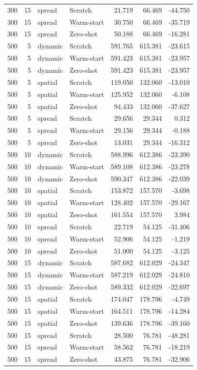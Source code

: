 \begin{tabular}{rrllrrr}
300 & 15 & spread & Scratch & 21.719 & 66.469 & -44.750 \\
300 & 15 & spread & Warm-start & 30.750 & 66.469 & -35.719 \\
300 & 15 & spread & Zero-shot & 50.188 & 66.469 & -16.281 \\
500 & 5 & dynamic & Scratch & 591.765 & 615.381 & -23.615 \\
500 & 5 & dynamic & Warm-start & 591.423 & 615.381 & -23.957 \\
500 & 5 & dynamic & Zero-shot & 591.423 & 615.381 & -23.957 \\
500 & 5 & spatial & Scratch & 119.050 & 132.060 & -13.010 \\
500 & 5 & spatial & Warm-start & 125.952 & 132.060 & -6.108 \\
500 & 5 & spatial & Zero-shot & 94.433 & 132.060 & -37.627 \\
500 & 5 & spread & Scratch & 29.656 & 29.344 & 0.312 \\
500 & 5 & spread & Warm-start & 29.156 & 29.344 & -0.188 \\
500 & 5 & spread & Zero-shot & 13.031 & 29.344 & -16.312 \\
500 & 10 & dynamic & Scratch & 588.996 & 612.386 & -23.390 \\
500 & 10 & dynamic & Warm-start & 589.108 & 612.386 & -23.278 \\
500 & 10 & dynamic & Zero-shot & 590.347 & 612.386 & -22.039 \\
500 & 10 & spatial & Scratch & 153.872 & 157.570 & -3.698 \\
500 & 10 & spatial & Warm-start & 128.402 & 157.570 & -29.167 \\
500 & 10 & spatial & Zero-shot & 161.554 & 157.570 & 3.984 \\
500 & 10 & spread & Scratch & 22.719 & 54.125 & -31.406 \\
500 & 10 & spread & Warm-start & 52.906 & 54.125 & -1.219 \\
500 & 10 & spread & Zero-shot & 51.000 & 54.125 & -3.125 \\
500 & 15 & dynamic & Scratch & 587.682 & 612.029 & -24.347 \\
500 & 15 & dynamic & Warm-start & 587.219 & 612.029 & -24.810 \\
500 & 15 & dynamic & Zero-shot & 589.332 & 612.029 & -22.697 \\
500 & 15 & spatial & Scratch & 174.047 & 178.796 & -4.749 \\
500 & 15 & spatial & Warm-start & 164.511 & 178.796 & -14.284 \\
500 & 15 & spatial & Zero-shot & 139.636 & 178.796 & -39.160 \\
500 & 15 & spread & Scratch & 28.500 & 76.781 & -48.281 \\
500 & 15 & spread & Warm-start & 58.562 & 76.781 & -18.219 \\
500 & 15 & spread & Zero-shot & 43.875 & 76.781 & -32.906 \\
\bottomrule
\end{tabular}